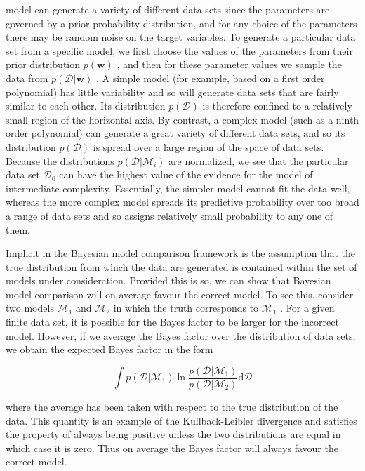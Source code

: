 \documentclass[
  10
]{article}
\begin{document}
model can generate a variety of different data sets since the parameters
are governed by a prior probability distribution, and for any choice of
the parameters there may be random noise on the target variables. To
generate a particular data set from a specific model, we first choose
the values of the parameters from their prior distribution
\(p ( \mathbf { w } )\) , and then for these parameter values we sample
the data from \(p ( \mathcal { D } | \mathbf { w } )\) . A simple model
(for example, based on a first order polynomial) has little variability
and so will generate data sets that are fairly similar to each other.
Its distribution \(p ( \mathcal { D } )\) is therefore confined to a
relatively small region of the horizontal axis. By contrast, a complex
model (such as a ninth order polynomial) can generate a great variety of
different data sets, and so its distribution \(p ( \mathcal { D } )\) is
spread over a large region of the space of data sets. Because the
distributions \(p ( \mathcal { D } | \mathcal { M } _ { i } )\) are
normalized, we see that the particular data set
\(\mathcal { D } _ { 0 }\) can have the highest value of the evidence
for the model of intermediate complexity. Essentially, the simpler model
cannot fit the data well, whereas the more complex model spreads its
predictive probability over too broad a range of data sets and so
assigns relatively small probability to any one of them.

Implicit in the Bayesian model comparison framework is the assumption
that the true distribution from which the data are generated is
contained within the set of models under consideration. Provided this is
so, we can show that Bayesian model comparison will on average favour
the correct model. To see this, consider two models
\(\mathcal { M } _ { 1 }\) and \(\mathcal { M } _ { 2 }\) in which the
truth corresponds to \(\mathcal { M } _ { 1 }\) . For a given finite
data set, it is possible for the Bayes factor to be larger for the
incorrect model. However, if we average the Bayes factor over the
distribution of data sets, we obtain the expected Bayes factor in the
form

\[
\int p (\mathcal {D} | \mathcal {M} _ {1}) \ln \frac {p (\mathcal {D} | \mathcal {M} _ {1})}{p (\mathcal {D} | \mathcal {M} _ {2})} \mathrm{d} \mathcal {D}\tag{3.73}
\]

where the average has been taken with respect to the true distribution
of the data. This quantity is an example of the Kullback-Leibler
divergence and satisfies the property of always being positive unless
the two distributions are equal in which case it is zero. Thus on
average the Bayes factor will always favour the correct model.
\end{document}
